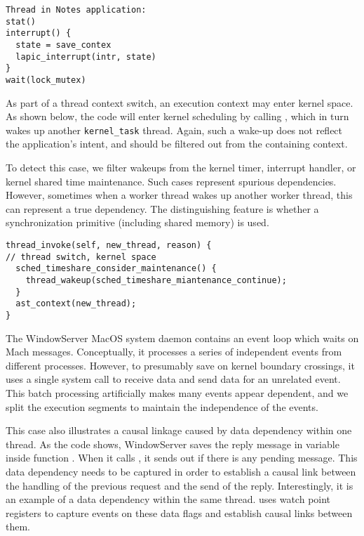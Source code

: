 {\footnotesize \begin{verbatim}
Thread in Notes application:
stat()
interrupt() {
  state = save_contex  
  lapic_interrupt(intr, state)
}
wait(lock_mutex)
\end{verbatim}
}

As part of a thread context switch, an execution context may enter kernel
space. As shown below, the code will enter kernel scheduling by calling
, which in turn wakes up another
\texttt{kernel\_task} thread.  Again, such a wake-up does not reflect the
application's intent, and should be filtered out from the containing context.  

To detect this case, we filter wakeups from the kernel timer, interrupt
handler, or kernel shared time maintenance. Such cases represent spurious
dependencies. However, sometimes when a worker thread wakes up another worker
thread, this can represent a true dependency. The distinguishing feature is
whether a synchronization primitive (including shared memory) is used.

{\footnotesize \begin{verbatim}
thread_invoke(self, new_thread, reason) {
// thread switch, kernel space
  sched_timeshare_consider_maintenance() {
    thread_wakeup(sched_timeshare_miantenance_continue);
  }
  ast_context(new_thread);
}
\end{verbatim}
}

The WindowServer MacOS system daemon contains an event loop which waits on Mach
messages. Conceptually, it processes a series of independent events from
different processes. However, to presumably save on kernel boundary crossings,
it uses a single system call to receive data and send data for an unrelated
event. This batch processing artificially makes many events appear dependent,
and we split the execution segments to maintain the independence of the events.

This case also illustrates a causal linkage caused by data dependency within
one thread.  As the code shows, WindowServer saves the reply message in
variable  inside function .  When it calls
, it sends out  if there is any pending
message.  This data dependency needs to be captured in order to establish a
causal link between the handling of the previous request and the send of the
reply.  Interestingly, it is an example of a data dependency within the same
thread.  \xxx uses watch point registers to capture events on these data flags
and establish causal links between them.


